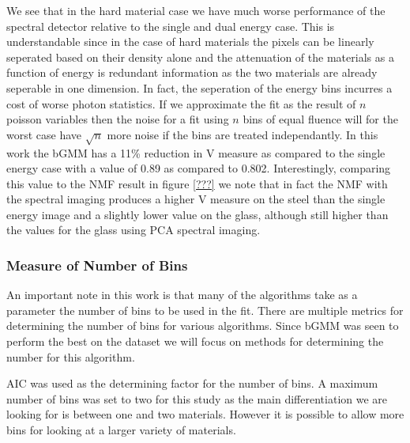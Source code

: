 \documentclass[11pt]{article}
\begin{document}
    We see that in the hard material case we have much worse performance of
the spectral detector relative to the single and dual energy case. This
is understandable since in the case of hard materials the pixels can be
linearly seperated based on their density alone and the attenuation of
the materials as a function of energy is redundant information as the
two materials are already seperable in one dimension. In fact, the
seperation of the energy bins incurres a cost of worse photon
statistics. If we approximate the fit as the result of \(n\) poisson
variables then the noise for a fit using \(n\) bins of equal fluence
will for the worst case have \(\sqrt{n}\) more noise if the bins are
treated independantly. In this work the bGMM has a 11\% reduction in V
measure as compared to the single energy case with a value of 0.89 as
compared to 0.802. Interestingly, comparing this value to the NMF result
in figure \ref{???} we note that in fact the NMF with the spectral
imaging produces a higher V measure on the steel than the single energy
image and a slightly lower value on the glass, although still higher
than the values for the glass using PCA spectral imaging.

    \hypertarget{measure-of-number-of-bins}{%
\subsubsection{Measure of Number of
Bins}\label{measure-of-number-of-bins}}

    An important note in this work is that many of the algorithms take as a
parameter the number of bins to be used in the fit. There are multiple
metrics for determining the number of bins for various algorithms. Since
bGMM was seen to perform the best on the dataset we will focus on
methods for determining the number for this algorithm.

    AIC was used as the determining factor for the number of bins. A maximum
number of bins was set to two for this study as the main differentiation
we are looking for is between one and two materials. However it is
possible to allow more bins for looking at a larger variety of
materials.





    \begin{center}
    \end{center}
    { \hspace*{\fill} \\}
    
\end{document}
